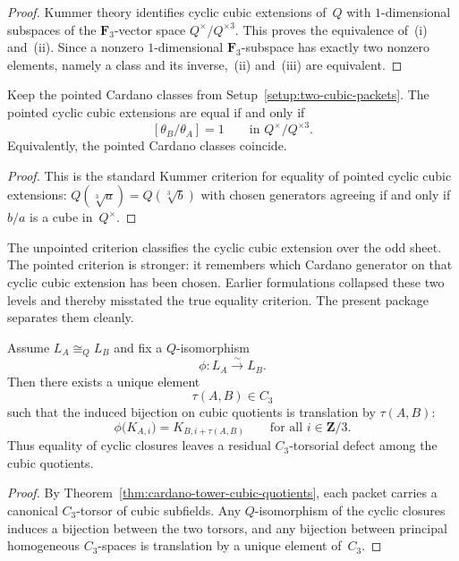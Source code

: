 \begin{proof}
Kummer theory identifies cyclic cubic extensions of~$Q$ with $1$-dimensional
subspaces of the $\mathbf F_3$-vector space $Q^{\times}/Q^{\times 3}$.  This
proves the equivalence of~(i) and~(ii).  Since a nonzero $1$-dimensional
$\mathbf F_3$-subspace has exactly two nonzero elements, namely a class and its
inverse,~(ii) and~(iii) are equivalent.
\end{proof}

\begin{theorem}
\label{thm:pointed-kummer-equality}
Keep the pointed Cardano classes from Setup~\ref{setup:two-cubic-packets}.  The
pointed cyclic cubic extensions are equal if and only if
\[
[\theta_B/\theta_A]=1
\qquad\text{in }Q^{\times}/Q^{\times 3}.
\]
Equivalently, the pointed Cardano classes coincide.
\end{theorem}

\begin{proof}
This is the standard Kummer criterion for equality of pointed cyclic cubic
extensions: $Q(\sqrt[3]{a})=Q(\sqrt[3]{b})$ with chosen generators agreeing if
and only if $b/a$ is a cube in~$Q^{\times}$.
\end{proof}

\begin{remark}
\label{rem:why-both-criteria-are-needed}
The unpointed criterion classifies the cyclic cubic extension over the odd
sheet.  The pointed criterion is stronger: it remembers which Cardano generator
on that cyclic cubic extension has been chosen.  Earlier formulations collapsed
these two levels and thereby misstated the true equality criterion.  The present
package separates them cleanly.
\end{remark}

\begin{proposition}
\label{prop:selector-torsor-defect}
Assume $L_A\cong_Q L_B$ and fix a $Q$-isomorphism
\[
\phi\colon L_A\xrightarrow{\sim} L_B.
\]
Then there exists a unique element
\[
\tau(A,B)\in C_3
\]
such that the induced bijection on cubic quotients is translation by
$\tau(A,B)$:
\[
\phi\bigl(K_{A,i}\bigr)=K_{B,i+\tau(A,B)}
\qquad\text{for all }i\in\mathbf Z/3.
\]
Thus equality of cyclic closures leaves a residual $C_3$-torsorial defect among
the cubic quotients.
\end{proposition}

\begin{proof}
By Theorem~\ref{thm:cardano-tower-cubic-quotients}, each packet carries a
canonical $C_3$-torsor of cubic subfields.  Any $Q$-isomorphism of the cyclic
closures induces a bijection between the two torsors, and any bijection between
principal homogeneous $C_3$-spaces is translation by a unique element of~$C_3$.
\end{proof}

